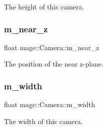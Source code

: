 The height of this camera. \hypertarget{classmage_1_1_camera_a685f8700a29d1f1eff2bec353c3ec970}{}\label{classmage_1_1_camera_a685f8700a29d1f1eff2bec353c3ec970} 
\subsubsection{\texorpdfstring{m\+\_\+near\+\_\+z}{m\_near\_z}}
{\footnotesize\ttfamily float mage\+::\+Camera\+::m\+\_\+near\+\_\+z\hspace{0.3cm}{\ttfamily [private]}}

The position of the near z-\/plane. \hypertarget{classmage_1_1_camera_acc8f371214af02fdac9a1ff04508c4ca}{}\label{classmage_1_1_camera_acc8f371214af02fdac9a1ff04508c4ca} 
\subsubsection{\texorpdfstring{m\+\_\+width}{m\_width}}
{\footnotesize\ttfamily float mage\+::\+Camera\+::m\+\_\+width\hspace{0.3cm}{\ttfamily [private]}}

The width of this camera. 